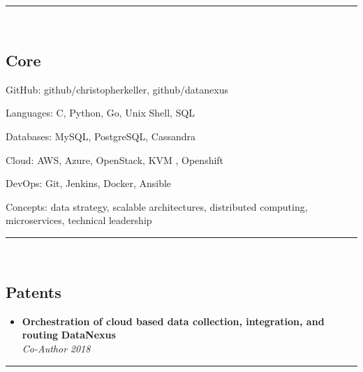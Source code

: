 

\hrule\
\vspace{-0.4em}
\subsection*{Core}
\begin{indentsection}{\parindent}
    \begin{description*}
        \item[GitHub:] github/christopherkeller, github/datanexus
        \item[Languages:] C, Python, Go, Unix Shell, \textsc{SQL}
        \item[Databases:] My\textsc{SQL}, Postgre\textsc{SQL}, Cassandra
        \item[Cloud:] AWS, Azure, OpenStack, KVM , Openshift
        \item[DevOps:] Git, Jenkins, Docker, Ansible
        \item[Concepts:] data strategy, scalable architectures, distributed computing, microservices, technical leadership
	\end{description*}
\end{indentsection}
\hrule\
\vspace{-0.4em}

\subsection*{Patents}

\begin{itemize}
    \parskip=0.1em
    \item
    \headerrow
        {\textbf{Orchestration of cloud based data collection, integration, and routing}}
        {\textbf{DataNexus}}
    \\
    \headerrow
        {\emph{Co-Author}}
        {\emph{2018}}
\end{itemize}

\hrule\
\vspace{-0.4em}


